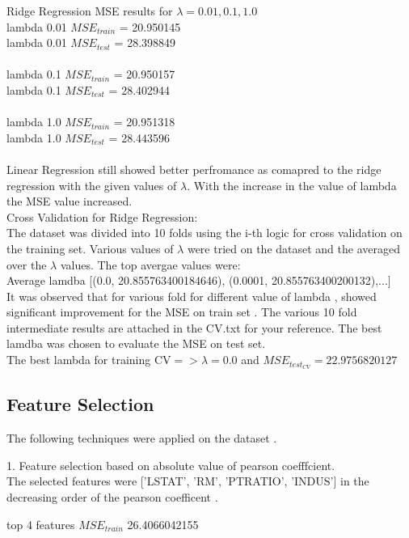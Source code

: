 \documentclass[10pt,letterpaper]{article}
\begin{document}
Ridge Regression MSE results for $\lambda = 0.01 ,0.1, 1.0$\\
lambda  0.01 $MSE_{train}$  =   20.950145\\
lambda  0.01 $MSE_{test}$   =   28.398849\\\\
lambda  0.1 $MSE_{train}$   =   20.950157\\
lambda  0.1 $MSE_{test}$    =   28.402944\\\\
lambda  1.0 $MSE_{train}$   =   20.951318\\
lambda  1.0 $MSE_{test}$    =   28.443596\\\\

Linear Regression still showed better perfromance as comapred to the ridge regression with the given values of $\lambda$. With the increase in the value of lambda the MSE value increased.\\

Cross Validation for Ridge Regression:\\
The dataset was divided into 10 folds using the i-th logic for cross validation on the training set. Various values of $\lambda$ were tried on the dataset and the averaged over the  $\lambda$ values.
The top avergae values were:\\
Average lamdba [(0.0, 20.855763400184646), (0.0001, 20.855763400200132),...]\\

It was observed that for various fold for different value of lambda , showed significant improvement for the MSE on train set . The various 10 fold intermediate results are attached in the CV.txt for your reference. The best lamdba was chosen to evaluate the MSE on test set.\\The best lambda for training CV$=>  \lambda = 0.0$ and $MSE_{test_{CV}} =  22.9756820127$

\subsection{Feature Selection}
The following techniques were applied on the dataset .

1.  Feature selection based on absolute value of pearson coefffcient.\\ The selected features were ['LSTAT', 'RM', 'PTRATIO', 'INDUS'] in the decreasing order of the pearson coefficent .

	top 4 features $MSE_{train}$  26.4066042155 
\end{document}

